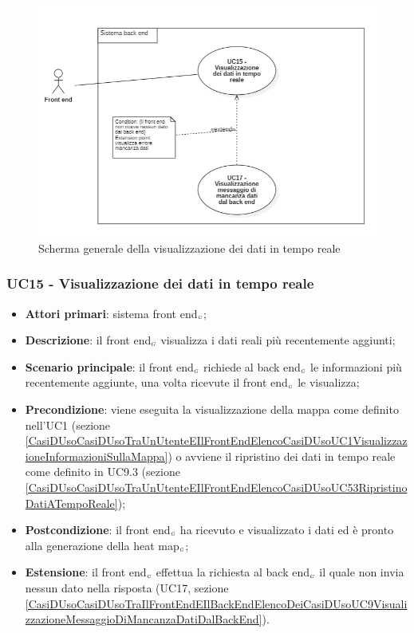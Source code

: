 \begin{center}
	\begin{figure}[H]
		\centering\includegraphics[scale=0.6]{../immagini/attori_casi/UC_15.png}
		\caption{Scherma generale della visualizzazione dei dati in tempo reale}
	\end{figure}
\end{center}


\subsubsection{UC15 - Visualizzazione dei dati in tempo reale}\label{CasiDUsoCasiDUsoTraIlFrontEndEIlBackEndElencoDeiCasiDUsoUC82VisualizzazioneDeiDatiInTempoReale}
\begin{itemize}
	\item \textbf{Attori primari}: sistema front end$_{\scaleto{G}{3pt}}$;
	\item \textbf{Descrizione}: il front end$_{\scaleto{G}{3pt}}$ visualizza i dati reali più recentemente aggiunti;
	\item \textbf{Scenario principale}: il front end$_{\scaleto{G}{3pt}}$ richiede al back end$_{\scaleto{G}{3pt}}$ le informazioni più recentemente aggiunte, una volta ricevute il front end$_{\scaleto{G}{3pt}}$ le visualizza;
	\item \textbf{Precondizione}: viene eseguita la visualizzazione della mappa come definito nell’UC1 (sezione \ref{CasiDUsoCasiDUsoTraUnUtenteEIlFrontEndElencoCasiDUsoUC1VisualizzazioneInformazioniSullaMappa}) o avviene il ripristino dei dati in tempo reale come definito in UC9.3 (sezione \ref{CasiDUsoCasiDUsoTraUnUtenteEIlFrontEndElencoCasiDUsoUC53RipristinoDatiATempoReale});
	\item \textbf{Postcondizione}: il front end$_{\scaleto{G}{3pt}}$ ha ricevuto e visualizzato i dati ed è pronto alla generazione della heat map$_{\scaleto{G}{3pt}}$;
	\item \textbf{Estensione}: il front end$_{\scaleto{G}{3pt}}$ effettua la richiesta al back end$_{\scaleto{G}{3pt}}$ il quale non invia nessun dato nella risposta (UC17, sezione \ref{CasiDUsoCasiDUsoTraIlFrontEndEIlBackEndElencoDeiCasiDUsoUC9VisualizzazioneMessaggioDiMancanzaDatiDalBackEnd}).
\end{itemize}

